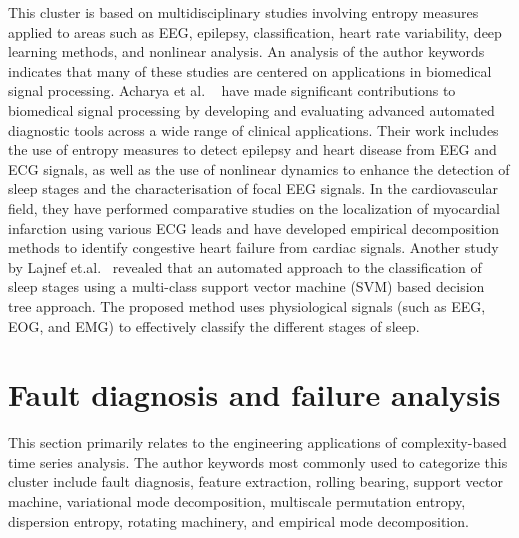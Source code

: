 This cluster is based on multidisciplinary studies involving entropy measures applied to areas such as EEG, epilepsy, classification, heart rate variability, deep learning methods, and nonlinear analysis. An analysis of the author keywords indicates that many of these studies are centered on applications in biomedical signal processing. 
Acharya et al. ~\cite{Acharya2015a, Acharya2015, Acharya2017, Acharya2016, Acharya2019,  Acharya2017a, Acharya2018} have made significant contributions to biomedical signal processing by developing and evaluating advanced automated diagnostic tools across a wide range of clinical applications. Their work includes the use of entropy measures to detect epilepsy and heart disease from EEG and ECG signals, as well as the use of nonlinear dynamics to enhance the detection of sleep stages and the characterisation of focal EEG signals. In the cardiovascular field, they have performed comparative studies on the localization of myocardial infarction using various ECG leads and have developed empirical decomposition methods to identify congestive heart failure from cardiac
signals. Another study by Lajnef et.al.~\cite{Lajnef2015} revealed that an automated approach to the classification of sleep stages using a multi-class support vector machine (SVM) based decision tree approach. The proposed method uses physiological signals (such as EEG, EOG, and EMG) to effectively classify the different stages of sleep.

\section{Fault diagnosis and failure analysis}\label{Sec:ReviewTopicFault}
This section primarily relates to the engineering applications of complexity-based time series analysis. The author keywords most commonly used to categorize this cluster include fault diagnosis, feature extraction, rolling bearing, support vector machine, variational mode decomposition, multiscale permutation entropy, dispersion entropy, rotating machinery, and empirical mode decomposition. 

